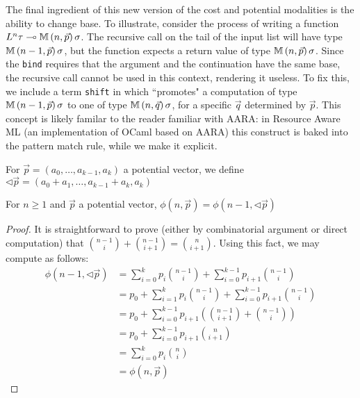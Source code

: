 The final ingredient of this new version of the cost and potential modalities is the ability to change base. To illustrate, consider the process of writing a function $L^n \tau \multimap \mathbb{M} \, (n,\vec{p}) \, \sigma$. The recursive call on the tail of the input list will have type $\mathbb{M} \, (n-1,\vec{p}) \, \sigma$, but the function expects a return value of type $\mathbb{M} \, (n,\vec{p}) \, \sigma$. Since the \texttt{bind} requires that the argument and the continuation have the same base, the recursive call cannot be used in this context, rendering it useless. To fix this, we include a term \texttt{shift} in \dlambdaamor which ``promotes" a computation of type $\mathbb{M} \, (n-1,\vec{p}) \, \sigma$ to one of type $\mathbb{M} \, (n,\vec{q}) \, \sigma$, for a specific $\vec{q}$ determined by $\vec{p}$. This concept is likely familar to the reader familiar with AARA: in Resource Aware ML (an implementation of OCaml based on AARA) this construct is baked into the pattern match rule, while we make it explicit.

\begin{definition}
For $\vec{p} = (a_0,\dots,a_{k-1},a_k)$ a potential vector, we define $\lhd \vec{p} = (a_0 + a_1,\dots,a_{k-1} + a_k,a_k)$
\end{definition}

\begin{theorem}
\label{thm:raml-shift}
For $n \geq 1$ and $\vec{p}$ a potential vector, $\phi(n,\vec{p}) = \phi(n-1,\lhd \vec{p})$
\end{theorem}
\begin{proof}
It is straightforward to prove (either by combinatorial argument or direct computation) that $\binom{n-1}{i} + \binom{n-1}{i+1} = \binom{n}{i+1}$. Using this fact,
we may compute as follows:
\begin{align*}
  \phi(n-1,\lhd \vec{p}) &= \sum_{i=0}^k p_i\binom{n-1}{i} + \sum_{i=0}^{k-1} p_{i+1}\binom{n-1}{i}\\
                         &= p_0 + \sum_{i=1}^k p_i\binom{n-1}{i} + \sum_{i=0}^{k-1} p_{i+1}\binom{n-1}{i}\\
                         &= p_0 + \sum_{i=0}^{k-1} p_{i+1}\left(\binom{n-1}{i+1} + \binom{n-1}{i}\right)\\
                         &= p_0 + \sum_{i=0}^{k-1} p_{i+1}\binom{n}{i+1}\\
                         &= \sum_{i=0}^k p_i \binom{n}{i}\\
                         &= \phi(n,\vec{p})
\end{align*}
\end{proof}

